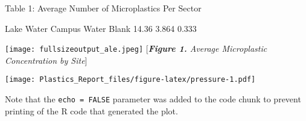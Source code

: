 \documentclass[]{article}
\begin{document}
Table 1: Average Number of Microplastics Per Sector

Lake Water Campus Water Blank 14.36 3.864 0.333

\texttt{[image: fullsizeoutput\_ale.jpeg]} {[}\emph{\textbf{Figure 1.}
Average Microplastic Concentration by Site}{]}

\texttt{[image: Plastics\_Report\_files/figure-latex/pressure-1.pdf]}

Note that the \texttt{echo\ =\ FALSE} parameter was added to the code
chunk to prevent printing of the R code that generated the plot.
\end{document}
